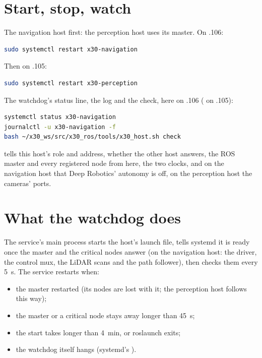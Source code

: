 \section{Start, stop, watch}

The navigation host first: the perception host uses its master. On .106:

\begin{lstlisting}[language=bash]
sudo systemctl restart x30-navigation
\end{lstlisting}

Then on .105:

\begin{lstlisting}[language=bash]
sudo systemctl restart x30-perception
\end{lstlisting}

The watchdog's status line, the log and the check, here on .106 ( on .105):

\begin{lstlisting}[language=bash]
systemctl status x30-navigation
journalctl -u x30-navigation -f
bash ~/x30_ws/src/x30_ros/tools/x30_host.sh check
\end{lstlisting}

 tells this host's role and address, whether the other host answers,
the ROS master and every registered node from here, the two clocks, and on the navigation host
that Deep Robotics' autonomy is off, on the perception host the cameras' ports.

\section{What the watchdog does}

The service's main process starts the host's launch file, tells systemd it is ready once the
master and the critical nodes answer (on the navigation host: the driver, the control mux, the
LiDAR scans and the path follower), then checks them every 5~s. The service restarts when:

\begin{itemize}
  \item the master restarted (its nodes are lost with it; the perception host follows this way);
  \item the master or a critical node stays away longer than 45~s;
  \item the start takes longer than 4~min, or roslaunch exits;
  \item the watchdog itself hangs (systemd's ).
\end{itemize}

